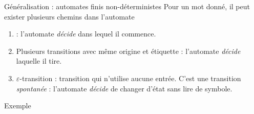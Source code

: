 
\begingroup

\begin{frame}{Généralisation : automates finis non-déterministes}
  Pour un mot donné, il peut exister plusieurs chemins dans l'automate
  \begin{enumerate}
  \item {} : l'automate \textit{décide} dans lequel il commence.
  \item \alert{Plusieurs transitions avec même origine et étiquette} : l'automate \textit{décide} laquelle il tire.
  \item {\color{example} $\varepsilon$-transition} : transition qui n'utilise aucune entrée.
    C'est une transition \textit{spontanée} : l'automate \textit{décide} de changer d'état sans lire de symbole.
  \end{enumerate}
  
  \begin{exampleblock}{Exemple}%
    \centering  
  \end{exampleblock}
\end{frame}

\endgroup
